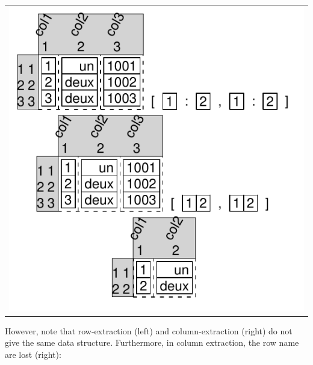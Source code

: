 \documentclass[pdflatex]{article}
\begin{document}
\begin{tabular}{c}
\includegraphics{dataframe_extracting.pdf}
\end{tabular}

However, note that row-extraction (left) and column-extraction (right) do not
give the same data structure. Furthermore, in column extraction, the row name
are lost (right):
\end{document}
